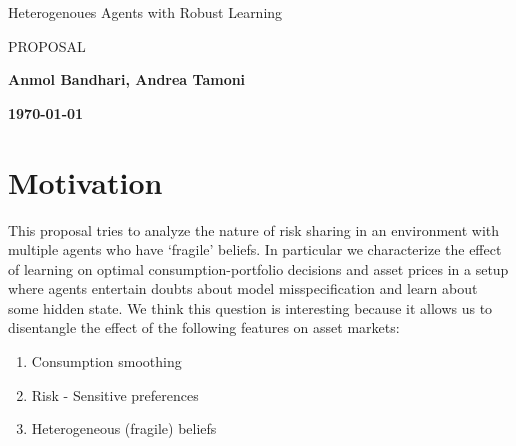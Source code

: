\documentclass[a4paper,12pt]{article}
\begin{document}
\null

\medskip
\bigskip
\bigskip
\centerline{\LARGE Heterogenoues Agents with Robust Learning}
\medskip
\medskip
\centerline{\LARGE PROPOSAL}
\centerline{}
\medskip
\centerline{}
\bigskip


\normalsize
\vspace{5 cm}
\vspace{8 cm}
\centerline{\bf Anmol Bandhari, Andrea Tamoni}
\centerline{\bf \today}

\newpage
\vspace{7cm}


\newpage
\tableofcontents



\vfill
\newpage
\setcounter{page}{1}
\pagestyle{plain}


\section{Motivation}
\noindent This proposal tries to analyze the nature of risk sharing in an environment with multiple agents who have `fragile' beliefs. In particular we characterize the effect of learning on optimal consumption-portfolio decisions and asset prices in a setup where agents entertain doubts about model misspecification and learn about some hidden state.
We think this question is interesting because it allows us to disentangle the effect of the following features on asset markets:

\begin{enumerate}
	\item Consumption smoothing
	\item Risk - Sensitive preferences
	\item Heterogeneous (fragile) beliefs 
\end{enumerate}
\end{document}
